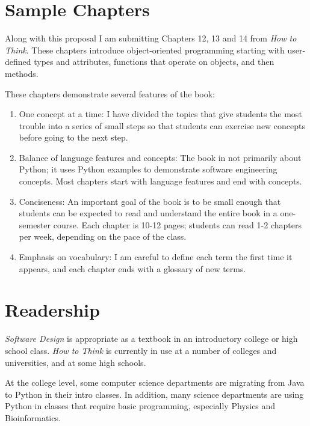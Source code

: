\documentclass{article}
\begin{document}
\section*{Sample Chapters}

Along with this proposal I am submitting Chapters 12, 13 and 14 from
{\em How to Think}.  These chapters introduce object-oriented programming
starting with user-defined types and attributes, functions that
operate on objects, and then methods.

These chapters demonstrate several features of the book:

\begin{enumerate}

\item One concept at a time: I have divided the topics that give students
the most trouble into a series of small steps so that students can
exercise new concepts before going to the next step.

\item Balance of language features and concepts: The book in not
primarily about Python; it uses Python examples to demonstrate
software engineering concepts.  Most chapters start with language
features and end with concepts.

\item Conciseness: An important goal of the book is to be small enough
that students can be expected to read and understand the entire book
in a one-semester course.  Each chapter is 10-12 pages; students can
read 1-2 chapters per week, depending on the pace of the class.

\item Emphasis on vocabulary: I am careful to define each term the first
time it appears, and each chapter ends with a glossary of new terms.

\end{enumerate}


\section*{Readership}

{\em Software Design} is appropriate as a textbook in an introductory
college or high school class.  {\em How to Think} is currently in use
at a number of colleges and universities, and at some high schools.

At the college level, some computer science departments are migrating
from Java to Python in their intro classes.  In addition, many science
departments are using Python in classes that require basic
programming, especially Physics and Bioinformatics.
\end{document}
